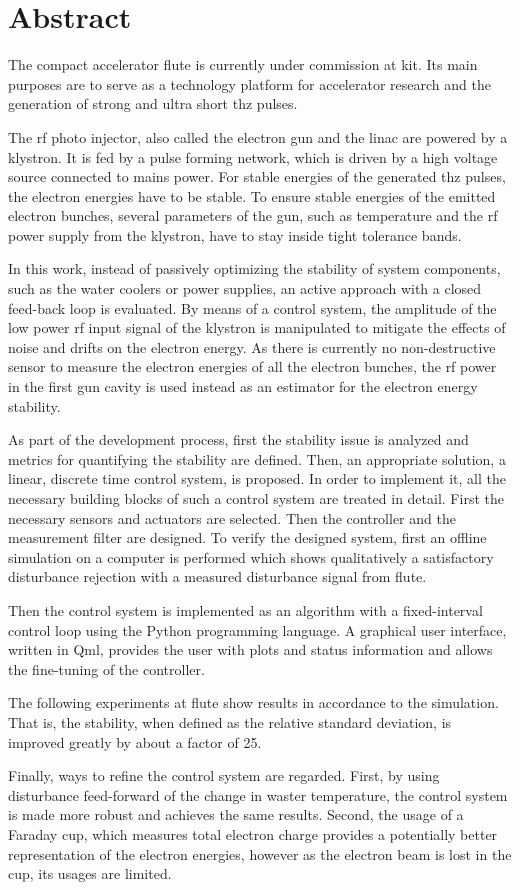 \chapter*{Abstract}
The compact accelerator \gls{flute} is currently under commission at \gls{kit}. Its main purposes are to serve as a technology platform for accelerator research and the generation of strong and ultra short \gls{thz} pulses.

The \gls{rf} photo injector, also called the electron gun and the \gls{linac} are powered by a klystron. It is fed by a pulse forming network, which is driven by a high voltage source connected to mains power. For stable energies of the generated \gls{thz} pulses, the electron energies have to be stable. To ensure stable energies of the emitted electron bunches, several parameters of the gun, such as temperature and the \gls{rf} power supply from the klystron, have to stay inside tight tolerance bands.

In this work, instead of passively optimizing the stability of system components, such as the water coolers or power supplies, an active approach with a closed feed-back loop is evaluated. By means of a control system, the amplitude of the low power \gls{rf} input signal of the klystron is manipulated to mitigate the effects of noise and drifts on the electron energy. As there is currently no non-destructive sensor to measure the electron energies of all the electron bunches, the \gls{rf} power in the first gun cavity is used instead as an estimator for the electron energy stability.

As part of the development process, first the stability issue is analyzed and metrics for quantifying the stability are defined. Then, an appropriate solution, a linear, discrete time control system, is proposed. In order to implement it, all the necessary building blocks of such a control system are treated in detail. First the necessary sensors and actuators are selected. Then the controller and the measurement filter are designed. To verify the designed system, first an offline simulation on a computer is performed which shows qualitatively a satisfactory disturbance rejection with a measured disturbance signal from \gls{flute}. 

Then the control system is implemented as an algorithm with a fixed-interval control loop using the Python programming language. A graphical user interface, written in Qml, provides the user with plots and status information and allows the fine-tuning of the controller.

The following experiments at \gls{flute} show results in accordance to the simulation. That is, the stability, when defined as the relative standard deviation, is improved greatly by about a factor of \num{25}.

Finally, ways to refine the control system are regarded. First, by using disturbance feed-forward of the change in waster temperature, the control system is made more robust and achieves the same results. Second, the usage of a Faraday cup, which measures total electron charge provides a potentially better representation of the electron energies, however as the electron beam is lost in the cup, its usages are limited.
\cleardoublepage
